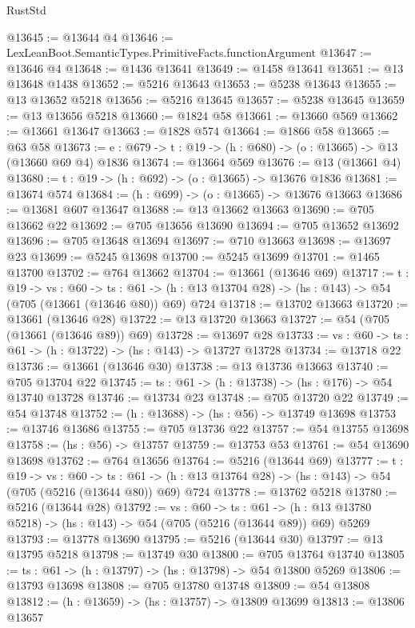 \begin{lexlean}{RustStd}
\begin{coremodule}
@13645 := @13644 @4
@13646 := LexLeanBoot.SemanticTypes.PrimitiveFacts.functionArgument
@13647 := @13646 @4
@13648 := @1436 @13641
@13649 := @1458 @13641
@13651 := @13 @13648 @1438
@13652 := @5216 @13643
@13653 := @5238 @13643
@13655 := @13 @13652 @5218
@13656 := @5216 @13645
@13657 := @5238 @13645
@13659 := @13 @13656 @5218
@13660 := @1824 @58
@13661 := @13660 @569
@13662 := @13661 @13647
@13663 := @1828 @574
@13664 := @1866 @58
@13665 := @63 @58
@13673 := {e : @679} -> {t : @19} -> (h : @680) -> (o : @13665) -> @13 (@13660 @69 @4) @1836
@13674 := @13664 @569
@13676 := @13 (@13661 @4)
@13680 := {t : @19} -> (h : @692) -> (o : @13665) -> @13676 @1836
@13681 := @13674 @574
@13684 := (h : @699) -> (o : @13665) -> @13676 @13663
@13686 := @13681 @607 @13647
@13688 := @13 @13662 @13663
@13690 := @705 @13662 @22
@13692 := @705 @13656 @13690
@13694 := @705 @13652 @13692
@13696 := @705 @13648 @13694
@13697 := @710 @13663
@13698 := @13697 @23
@13699 := @5245 @13698
@13700 := @5245 @13699
@13701 := @1465 @13700
@13702 := @764 @13662
@13704 := @13661 (@13646 @69)
@13717 := {t : @19} ->
  {vs : @60} ->
  {ts : @61} -> (h : @13 @13704 @28) -> (hs : @143) -> @54 (@705 (@13661 (@13646 @80)) @69) @724
@13718 := @13702 @13663
@13720 := @13661 (@13646 @28)
@13722 := @13 @13720 @13663
@13727 := @54 (@705 (@13661 (@13646 @89)) @69)
@13728 := @13697 @28
@13733 := {vs : @60} -> {ts : @61} -> (h : @13722) -> (hs : @143) -> @13727 @13728
@13734 := @13718 @22
@13736 := @13661 (@13646 @30)
@13738 := @13 @13736 @13663
@13740 := @705 @13704 @22
@13745 := {ts : @61} -> (h : @13738) -> (hs : @176) -> @54 @13740 @13728
@13746 := @13734 @23
@13748 := @705 @13720 @22
@13749 := @54 @13748
@13752 := (h : @13688) -> (hs : @56) -> @13749 @13698
@13753 := @13746 @13686
@13755 := @705 @13736 @22
@13757 := @54 @13755 @13698
@13758 := (hs : @56) -> @13757
@13759 := @13753 @53
@13761 := @54 @13690 @13698
@13762 := @764 @13656
@13764 := @5216 (@13644 @69)
@13777 := {t : @19} ->
  {vs : @60} ->
  {ts : @61} -> (h : @13 @13764 @28) -> (hs : @143) -> @54 (@705 (@5216 (@13644 @80)) @69) @724
@13778 := @13762 @5218
@13780 := @5216 (@13644 @28)
@13792 := {vs : @60} ->
  {ts : @61} -> (h : @13 @13780 @5218) -> (hs : @143) -> @54 (@705 (@5216 (@13644 @89)) @69) @5269
@13793 := @13778 @13690
@13795 := @5216 (@13644 @30)
@13797 := @13 @13795 @5218
@13798 := @13749 @30
@13800 := @705 @13764 @13740
@13805 := {ts : @61} -> (h : @13797) -> (hs : @13798) -> @54 @13800 @5269
@13806 := @13793 @13698
@13808 := @705 @13780 @13748
@13809 := @54 @13808
@13812 := (h : @13659) -> (hs : @13757) -> @13809 @13699
@13813 := @13806 @13657

\end{coremodule}
\end{lexlean}
